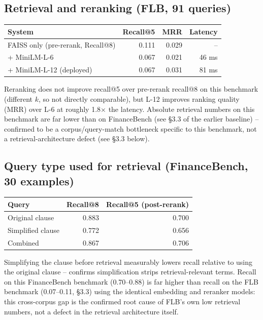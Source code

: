 \documentclass[11pt]{article}
\begin{document}
\subsection{Retrieval and reranking (FLB, 91 queries)}
\begin{table}[h!]
\centering
\begin{tabular}{lrrr}
\toprule
System & Recall@5 & MRR & Latency \\
\midrule
FAISS only (pre-rerank, Recall@8) & 0.111 & 0.029 & -- \\
+ MiniLM-L-6 & 0.067 & 0.021 & 46 ms \\
+ MiniLM-L-12 (deployed) & 0.067 & 0.031 & 81 ms \\
\bottomrule
\end{tabular}
\end{table}
\noindent Reranking does not improve recall@5 over pre-rerank recall@8 on this benchmark (different
$k$, so not directly comparable), but L-12 improves ranking quality (MRR) over L-6 at roughly
1.8$\times$ the latency. Absolute retrieval numbers on this benchmark are far lower than on
FinanceBench (see \S3.3 of the earlier baseline) -- confirmed to be a corpus/query-match
bottleneck specific to this benchmark, not a retrieval-architecture defect (see \S3.3 below).

\subsection{Query type used for retrieval (FinanceBench, 30 examples)}
\begin{table}[h!]
\centering
\begin{tabular}{lrr}
\toprule
Query & Recall@8 & Recall@5 (post-rerank) \\
\midrule
Original clause & 0.883 & 0.700 \\
Simplified clause & 0.772 & 0.656 \\
Combined & 0.867 & 0.706 \\
\bottomrule
\end{tabular}
\end{table}
\noindent Simplifying the clause before retrieval measurably lowers recall relative to using the
original clause -- confirms simplification strips retrieval-relevant terms. Recall on this
FinanceBench benchmark (0.70--0.88) is far higher than recall on the FLB benchmark (0.07--0.11,
\S3.3) using the identical embedding and reranker models: this cross-corpus gap is the confirmed
root cause of FLB's own low retrieval numbers, not a defect in the retrieval architecture itself.
\end{document}
